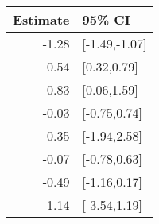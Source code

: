\begin{tabular}{rl}
  \hline
Estimate & 95\% CI \\ 
  \hline
-1.28 & [-1.49,-1.07] \\ 
  0.54 & [0.32,0.79] \\ 
  0.83 & [0.06,1.59] \\ 
  -0.03 & [-0.75,0.74] \\ 
  0.35 & [-1.94,2.58] \\ 
  -0.07 & [-0.78,0.63] \\ 
  -0.49 & [-1.16,0.17] \\ 
  -1.14 & [-3.54,1.19] \\ 
   \hline
\end{tabular}

